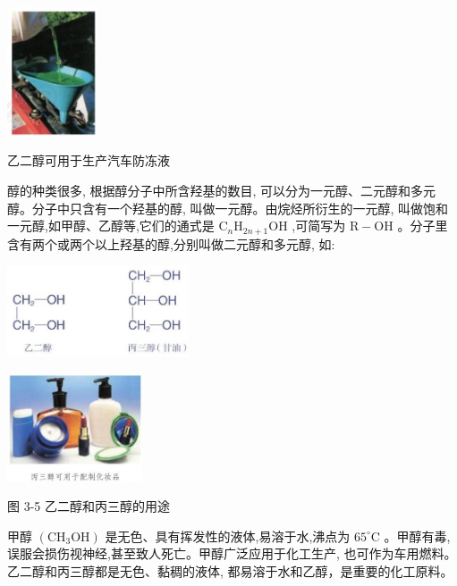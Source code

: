\documentclass[10pt]{article}
\begin{document}
\begin{center}
\includegraphics[max width=0.2\textwidth]{images/0190efc5-b58a-7c43-bfb0-e0a030df9cfd_64_466570.jpg}
\end{center}

乙二醇可用于生产汽车防冻液

醇的种类很多, 根据醇分子中所含羟基的数目, 可以分为一元醇、二元醇和多元醇。分子中只含有一个羟基的醇, 叫做一元醇。由烷烃所衍生的一元醇, 叫做饱和一元醇,如甲醇、乙醇等,它们的通式是 \({\mathrm{C}}_{n}{\mathrm{H}}_{{2n} + 1}\mathrm{{OH}}\) ,可简写为 \(\mathrm{R} - \mathrm{{OH}}\) 。分子里含有两个或两个以上羟基的醇,分别叫做二元醇和多元醇, 如:

\begin{center}
\includegraphics[max width=0.4\textwidth]{images/0190efc5-b58a-7c43-bfb0-e0a030df9cfd_64_665955.jpg}
\end{center}

\begin{center}
\includegraphics[max width=0.3\textwidth]{images/0190efc5-b58a-7c43-bfb0-e0a030df9cfd_64_620070.jpg}
\end{center}

图 3-5 乙二醇和丙三醇的用途

甲醇 \(\left( {{\mathrm{{CH}}}_{3}\mathrm{{OH}}}\right)\) 是无色、具有挥发性的液体,易溶于水,沸点为 \({65}^{ \circ }\mathrm{C}\) 。甲醇有毒,误服会损伤视神经,甚至致人死亡。甲醇广泛应用于化工生产, 也可作为车用燃料。 乙二醇和丙三醇都是无色、黏稠的液体, 都易溶于水和乙醇，是重要的化工原料。
\end{document}

